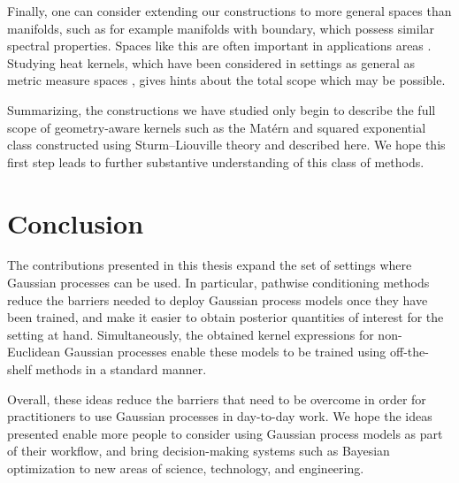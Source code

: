 \documentclass[11pt]{book}
\begin{document}
Finally, one can consider extending our constructions to more general spaces than manifolds, such as for example manifolds with boundary, which possess similar spectral properties.
Spaces like this are often important in applications areas \cite{solin18,krainski18,solin19,coveney20}.
Studying heat kernels, which have been considered in settings as general as metric measure spaces \cite{grigoryan03,grigoryan14}, gives hints about the total scope which may be possible.

Summarizing, the constructions we have studied only begin to describe the full scope of geometry-aware kernels such as the Matérn and squared exponential class constructed using Sturm--Liouville theory and described here.
We hope this first step leads to further substantive understanding of this class of methods.

\section{Conclusion}

The contributions presented in this thesis expand the set of settings where Gaussian processes can be used.
In particular, pathwise conditioning methods reduce the barriers needed to deploy Gaussian process models once they have been trained, and make it easier to obtain posterior quantities of interest for the setting at hand.
Simultaneously, the obtained kernel expressions for non-Euclidean Gaussian processes enable these models to be trained using off-the-shelf methods in a standard manner.

Overall, these ideas reduce the barriers that need to be overcome in order for practitioners to use Gaussian processes in day-to-day work.
We hope the ideas presented enable more people to consider using Gaussian process models as part of their workflow, and bring decision-making systems such as Bayesian optimization to new areas of science, technology, and engineering.



\printbibliography[heading=bibintoc,title={References}]
\end{document}
